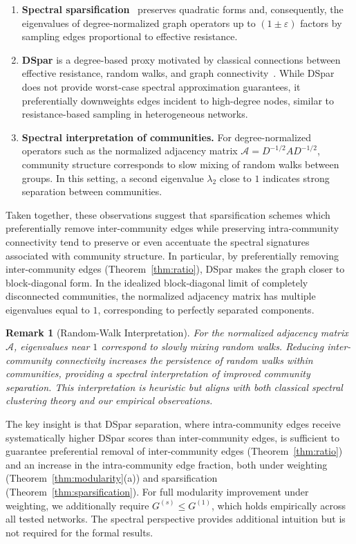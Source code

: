 \documentclass[10pt,journal,compsoc]{IEEEtran}
\newtheorem{remark}{Remark}
\begin{document}
\begin{enumerate}
    \item \textbf{Spectral sparsification}~\cite{spielman2008graph} preserves
    quadratic forms and, consequently, the eigenvalues of degree-normalized
    graph operators up to $(1\pm\varepsilon)$ factors by sampling edges
    proportional to effective resistance.
    \item \textbf{DSpar} is a degree-based proxy motivated by classical
    connections between effective resistance, random walks, and graph
    connectivity~\cite{doyle1984random,spielman2008graph}. While DSpar does not
    provide worst-case spectral approximation guarantees, it preferentially
    downweights edges incident to high-degree nodes, similar to resistance-based
    sampling in heterogeneous networks.
    \item \textbf{Spectral interpretation of communities.} For degree-normalized
    operators such as the normalized adjacency matrix
    $\mathcal{A}=D^{-1/2}AD^{-1/2}$, community structure corresponds to slow
    mixing of random walks between groups. In this setting, a second eigenvalue
    $\lambda_2$ close to $1$ indicates strong separation between communities.
\end{enumerate}

Taken together, these observations suggest that sparsification schemes which
preferentially remove inter-community edges while preserving intra-community
connectivity tend to preserve or even accentuate the spectral signatures associated with community structure. In particular, by preferentially removing inter-community edges (Theorem~\ref{thm:ratio}), DSpar makes the graph closer to
block-diagonal form. In the idealized block-diagonal limit of completely disconnected communities, the normalized adjacency matrix has multiple eigenvalues equal to $1$, corresponding to perfectly separated components.

\begin{remark}[Random-Walk Interpretation]
For the normalized adjacency matrix $\mathcal{A}$, eigenvalues near $1$
correspond to slowly mixing random walks. Reducing inter-community connectivity
increases the persistence of random walks within communities, providing a
spectral interpretation of improved community separation. This interpretation
is heuristic but aligns with both classical spectral clustering theory and our
empirical observations.
\end{remark}

The key insight is that DSpar separation, where intra-community edges receive
systematically higher DSpar scores than inter-community edges, is sufficient to
guarantee preferential removal of inter-community edges
(Theorem~\ref{thm:ratio}) and an increase in the intra-community edge fraction,
both under weighting (Theorem~\ref{thm:modularity}(a)) and sparsification
(Theorem~\ref{thm:sparsification}). For full modularity improvement under
weighting, we additionally require $G^{(s)} \leq G^{(1)}$, which holds
empirically across all tested networks. The spectral perspective provides
additional intuition but is not required for the formal results.
\end{document}
